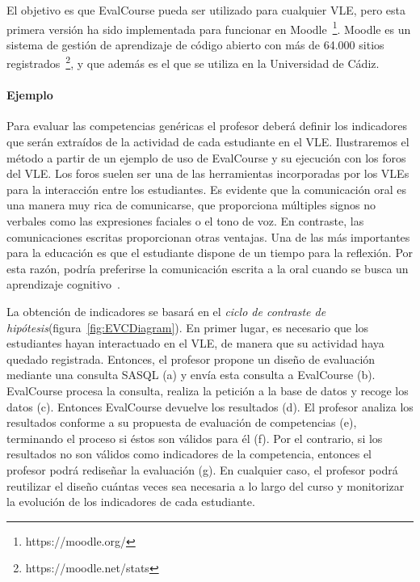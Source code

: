 			El objetivo es que EvalCourse pueda ser utilizado para cualquier VLE, pero esta primera versión ha sido implementada para funcionar en Moodle~\footnote{https://moodle.org/}. Moodle es un sistema de gestión de aprendizaje de código abierto con más de 64.000 sitios registrados~\footnote{https://moodle.net/stats}, y que además es el que se utiliza en la Universidad de Cádiz.


			\paragraph{Ejemplo}

			Para evaluar las competencias genéricas el profesor deberá definir los indicadores que serán extraídos de la actividad de cada estudiante en el VLE. Ilustraremos el método a partir de un ejemplo de uso de EvalCourse y su ejecución con los foros del VLE. Los foros suelen ser una de las herramientas incorporadas por los VLEs para la interacción entre los estudiantes. Es evidente que la comunicación oral es una manera muy rica de comunicarse, que proporciona múltiples signos no verbales como las expresiones faciales o el tono de voz. En contraste, las comunicaciones escritas proporcionan otras ventajas. Una de las más importantes para la educación es que el estudiante dispone de un tiempo para la reflexión. Por esta razón, podría preferirse la comunicación escrita a la oral cuando se busca un aprendizaje cognitivo~\cite{garrison1999critical}.

			La obtención de indicadores se basará en el \emph{ciclo de contraste de hipótesis}(figura~\ref{fig:EVCDiagram}). En primer lugar, es necesario que los estudiantes hayan interactuado en el VLE, de manera que su actividad haya quedado registrada. Entonces, el profesor propone un diseño de evaluación mediante una consulta SASQL (a) y envía esta consulta a EvalCourse (b). EvalCourse procesa la consulta, realiza la petición a la base de datos y recoge los datos (c). Entonces EvalCourse devuelve los resultados (d). El profesor analiza los resultados conforme a su propuesta de evaluación de competencias (e), terminando el proceso si éstos son válidos para él (f). Por el contrario, si los resultados no son válidos como indicadores de la competencia, entonces el profesor podrá rediseñar la evaluación (g). En cualquier caso, el profesor podrá reutilizar el diseño cuántas veces sea necesaria a lo largo del curso y monitorizar la evolución de los indicadores de cada estudiante.

